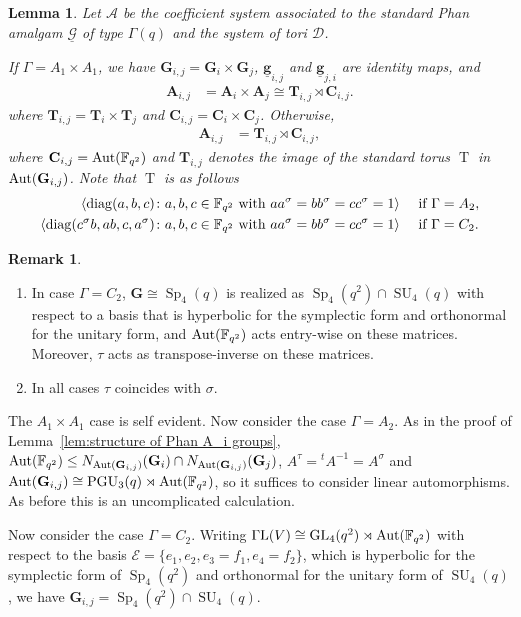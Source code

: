 \documentclass[12pt]{amsart}
\newtheorem{lemma}[theorem]{Lemma}
\theoremstyle{definition}
\newtheorem{remark}[theorem]{Remark}
\newcommand{\bpf}{\noindent{\bf Proof}\hspace{7pt}}
\newcommand{\ble}{\begin{lemma}}
\newcommand{\ele}{\end{lemma}}
\newcommand{\bre}{\begin{remark}}
\newcommand{\ere}{\end{remark}}
\newcommand{\ul}{\underline}
\newcommand{\cD}{{\mathcal D}}
\newcommand{\cE}{{\mathcal E}}
\newcommand{\Aut}{\mathop{\rm Aut}\nolimits}
\newcommand{\diag}{\mathop{\rm diag}\nolimits}
\def\cD{{\mathcal D}}
\newcommand{\FF}{{\mathbb F}}
\DeclareMathOperator{\GL}{GL}
\DeclareMathOperator{\GD}{T}
\DeclareMathOperator{\SU}{SU}
\DeclareMathOperator{\Sp}{Sp}
\DeclareMathOperator{\PGU}{PGU}
\newcommand{\GamL}{\mathop{\rm \Gamma L}}
\newcommand{\trin}{\tau}
\newcommand{\amgrpA}{{\mathbf{A}}}
\newcommand{\amgrpC}{{\mathbf{C}}}
\newcommand{\amgrpG}{{\mathbf{G}}}
\newcommand{\amgrpT}{{\mathbf{T}}}
\newcommand{\famg}{\ul{\mathbf g}}
\newcommand{\amA}{{\mathscr{A}}}
\newcommand{\famG}{\ul{\mathscr{G}}}
\newcommand{\liediag}{\Gamma}
\begin{document}
\ble\label{lem:structure of Phan A_ij groups}
Let $\amA$ be the coefficient system associated to the standard Phan amalgam $\famG$ of type $\liediag(q)$ and the system of tori $\cD$.

If $\Gamma=A_1\times A_1$, we have $\amgrpG_{i,j}=\amgrpG_i\times\amgrpG_j$, $\famg_{i,j}$ and $\famg_{j,i}$ are identity maps, and  
\begin{align}
\amgrpA_{i,j}&=\amgrpA_i\times\amgrpA_j\cong \amgrpT_{i,j}\rtimes\amgrpC_{i,j}.\label{eqn:Phan N Xi Xj A1timesA1}
\end{align}
where $\amgrpT_{i,j}=\amgrpT_i\times\amgrpT_j$ and $\amgrpC_{i,j}=\amgrpC_i\times\amgrpC_j$.
Otherwise, 
\begin{align*}
\amgrpA_{i,j}&=\amgrpT_{i,j}\rtimes\amgrpC_{i,j},
\end{align*}
where 
 $\amgrpC_{i,j}=\Aut(\FF_{q^2})$ and  $\amgrpT_{i,j}$ denotes the image of the standard torus $\GD$ in $\Aut(\amgrpG_{i,j})$.
Note that $\GD$ is as follows 
\begin{alignat*}{2}
\langle \diag(a,b,c)\colon &    a,b,c\in \FF_{q^2}\mbox{ with } aa^\sigma=bb^\sigma=cc^\sigma=1 \rangle && \mbox{ if } \liediag=A_2,\\
\langle \diag(c^\sigma b, ab ,c,a^\sigma)\colon &   a,b,c\in \FF_{q^2}\mbox{ with } aa^\sigma=bb^\sigma=cc^\sigma=1 \rangle && \mbox{ if } \liediag=C_2.
\end{alignat*}
\ele

\bre
\begin{enumerate}
\item In case $\liediag=C_2$, $\amgrpG\cong\Sp_4(q)$ is realized as $\Sp_4(q^2)\cap \SU_4(q)$
 with respect to a basis that is 
 hyperbolic for the symplectic form and orthonormal for the unitary form, and $\Aut(\FF_{q^2})$ acts entry-wise on these matrices. 
Moreover, $\tau$ acts as transpose-inverse on these matrices.
\item In all cases $\trin$ coincides with $\sigma$. 
\end{enumerate}
\ere

\bpf
The $A_1\times A_1$ case is self evident.
Now consider the case $\liediag=A_2$.
As in the proof of Lemma~\ref{lem:structure of Phan A_i groups}, $\Aut(\FF_{q^2})\le N_{\Aut(\amgrpG_{i,j})}(\amgrpG_i)\cap N_{\Aut(\amgrpG_{i,j})}(\amgrpG_j)$, $A^\trin={}^tA^{-1}=A^\sigma$ and $\Aut(\amgrpG_{i,j})\cong\PGU_3(q)\rtimes\Aut(\FF_{q^2})$, so it suffices to consider linear automorphisms.
As before this is an uncomplicated calculation.

Now consider the case $\liediag=C_2$. Writing $\GamL(V)\cong \GL_4(q^2)\rtimes\Aut(\FF_{q^2})$ with respect to the basis $\cE=\{e_1,e_2,e_3=f_1,e_4=f_2\}$, which is hyperbolic for the symplectic form of $\Sp_4(q^2)$ and orthonormal for the unitary form of $\SU_4(q)$, we have $\amgrpG_{i,j}=\Sp_4(q^2)\cap \SU_4(q)$.
\end{document}
